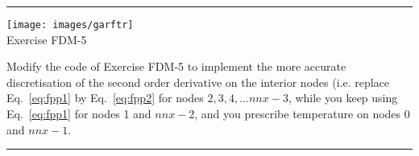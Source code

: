 \begin{center}
\begin{minipage}[t]{0.77\textwidth}
\par\noindent\rule{\textwidth}{0.4pt}

\begin{center}
\texttt{[image: images/garftr]} \\
{\color{orange}Exercise FDM-5}
\end{center}

Modify the code of Exercise FDM-5 to implement 
the more accurate discretisation of the 
second order derivative on the interior nodes
(i.e. replace Eq.~\eqref{eq:fpp1} by Eq.~\eqref{eq:fpp2}
for nodes $2,3,4,...nnx-3$, while you keep using 
Eq.~\eqref{eq:fpp1} for nodes 1 and $nnx-2$, and 
you prescribe temperature on nodes 0 and $nnx-1$.
\par\noindent\rule{\textwidth}{0.4pt}
\end{minipage}
\end{center}





